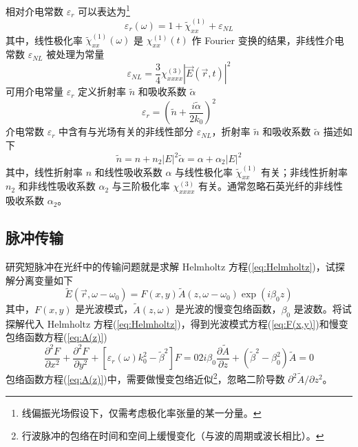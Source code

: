 相对介电常数 $\varepsilon_r$ 可以表达为\footnote{线偏振光场假设下，仅需考虑极化率张量的某一分量。}
\begin{equation}
    \varepsilon_r(\omega)=1+\widetilde{\chi}_{xx}^{(1)}+\varepsilon_{NL}
\end{equation}
其中，线性极化率 $\widetilde{\chi}_{xx}^{(1)}(\omega)$ 是 $\chi_{xx}^{(1)}(t)$ 作 Fourier 变换的结果，非线性介电常数 $\varepsilon_{NL}$ 被处理为常量
\begin{equation}
    \varepsilon_{NL}=\frac{3}{4}\chi_{xxxx}^{(3)}\left|\vec{E}(\vec{r},t)\right|^2    
\end{equation}
可用介电常量 $\varepsilon_r$ 定义折射率 $\widetilde{n}$ 和吸收系数 $\widetilde{\alpha}$
\begin{equation}
    \varepsilon_r=\left(\widetilde{n}+\frac{i\widetilde{\alpha}}{2k_0}\right)^2
\end{equation}
介电常数 $\varepsilon_r$ 中含有与光场有关的非线性部分 $\varepsilon_{NL}$，折射率 $\widetilde{n}$ 和吸收系数 $\widetilde{\alpha}$ 描述如下
\begin{subequations}
    \begin{equation}
        \widetilde{n}=n+n_2|E|^2        
    \end{equation}
    \begin{equation}
        \widetilde{\alpha}=\alpha+\alpha_2|E|^2        
    \end{equation}
\end{subequations}
其中，线性折射率 $n$ 和线性吸收系数 $\alpha$ 与线性极化率 $\widetilde{\chi}_{xx}^{(1)}$ 有关；非线性折射率 $n_2$ 和非线性吸收系数 $\alpha_2$ 与三阶极化率 $\chi_{xxxx}^{(3)}$ 有关。通常忽略石英光纤的非线性吸收系数 $\alpha_2$。
\subsection{脉冲传输}
\label{sec:Schrodinger}
研究短脉冲在光纤中的传输问题就是求解 Helmholtz 方程(\ref{eq:Helmholtz})，试探解分离变量如下
\begin{equation}
    \widetilde{E}(\vec{r},\omega-\omega_0)=F(x,y)\widetilde{A}(z,\omega-\omega_0)\exp(i\beta_0z)
\end{equation}
其中，$F(x,y)$ 是光波模式，$\widetilde{A}(z,\omega)$ 是光波的慢变包络函数，$\beta_0$ 是波数。将试探解代入 Helmholtz 方程(\ref{eq:Helmholtz})，得到光波模式方程(\ref{eq:F(x,y)})和慢变包络函数方程(\ref{eq:A(z)})
\begin{subequations}
    \begin{equation}
        \frac{\partial^2F}{\partial x^2}+\frac{\partial^2F}{\partial y^2}+\left[\varepsilon_r(\omega)k_0^2-\widetilde{\beta}^2\right]F=0
        \label{eq:F(x,y)}
    \end{equation}
    \begin{equation}
        2i\beta_0\frac{\partial \widetilde{A}}{\partial z}+\left(\widetilde{\beta}^2-\beta_0^2\right)\widetilde{A}=0
        \label{eq:A(z)}
    \end{equation}
\end{subequations}
包络函数方程(\ref{eq:A(z)})中，需要做慢变包络近似\footnote{行波脉冲的包络在时间和空间上缓慢变化（与波的周期或波长相比）。}，忽略二阶导数 $\partial^2\widetilde{A}/\partial z^2$。

